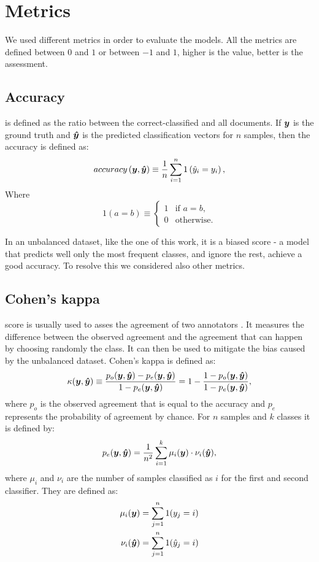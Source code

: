 \section{Metrics}\label{sec:metrics}
We used different metrics in order to evaluate the models.
All the metrics are defined between $0$ and $1$ or between $-1$ and $1$,
higher is the value, better is the assessment.

\subsection{Accuracy}
is defined
as the ratio between the correct-classified and all documents. If $\bm{y}$
is the ground truth and $\bm{\hat y}$ is the predicted
classification vectors for $n$ samples, then the accuracy is defined
as:
\begin{equation*}
  accuracy\left(\bm{y}, \bm{\hat y}\right) \equiv
  \frac{1}{n}\sum_{i=1}^{n} 1\left(\hat y_i = y_i\right),
\end{equation*}
Where
\begin{equation*}
  1(a = b)\equiv
  \begin{cases}
    1 & \text{if }a = b,\\
    0 & \text{otherwise}.
  \end{cases}
\end{equation*}

In an
unbalanced dataset, like the one of this work, it is a biased score -
a model that predicts well only the most frequent classes, and ignore
the rest, achieve a good accuracy. To resolve this we considered also
other metrics.

\subsection{Cohen's kappa} score is usually used to asses
the agreement of two annotators \cite{cohen_coefficient_1960}. It
measures the difference between the observed agreement and the
agreement that can happen by choosing randomly the class. It can then
be used to mitigate the bias caused by the unbalanced dataset. Cohen's
kappa is defined as:
\begin{equation*}
  \kappa(\bm{y}, \bm{\hat y})\equiv \frac{p_o(\bm{y}, \bm{\hat y}) -p_e(\bm{y}, \bm{\hat y})}{1-p_e(\bm{y}, \bm{\hat y})} = 1-\frac{1-p_o(\bm{y}, \bm{\hat y})}{1-p_e(\bm{y}, \bm{\hat y})},
\end{equation*}
where $p_o$ is the observed agreement that is equal to the accuracy
and $p_e$ represents the probability of agreement by chance. For $n$
samples and $k$ classes it is
defined by:
\begin{equation*}
  p_e(\bm{y}, \bm{\hat y}) = \frac{1}{n^2}\sum_{i=1}^{k} \mu_{i}(\bm{y})\cdot\nu_{i}(\bm{\hat y}),
\end{equation*}
where $\mu_{i}$ and $\nu_{i}$ are the number of samples classified as
$i$ for the first and second classifier. They are defined as:
\begin{align*}
  \mu_i(\bm{y}) &= \sum_{j=1}^{n}1(y_j = i)\\
  \nu_i(\bm{\hat y}) &= \sum_{j=1}^{n}1(\hat y_j = i)
\end{align*}

